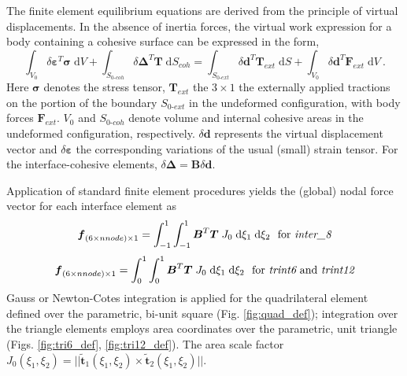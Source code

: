 \documentclass[11pt]{report}
\numberwithin{equation}{section}
\newcommand{\bmf } {\boldsymbol }  %
\newcommand{\ti}{\emph}
\begin{document}
The finite element equilibrium equations are derived from the 
principle of virtual displacements. In the absence of inertia forces, the virtual work 
expression for a body containing a cohesive surface can be expressed in the form,
%
\begin{equation}
\int_{V_0} \delta \bmf{\varepsilon}^T \bmf{\sigma} \;\mathrm{d}V +
\int_{S_{0\mbox{-}coh}} \delta \bmf{\Delta}^T \bmf{T} \;\mathrm{d}S_{coh} =
\int_{S_{0\mbox{-}ext}} \delta \bmf{d}^T \bmf{T}_{ext} \;\mathrm{d}S+
\int_{V_0} \delta \bmf{d}^T \bmf{F}_{ext} \;\mathrm{d}V\ . 
\end {equation}
%
\noindent Here $\bmf{\sigma}$ denotes the stress tensor, 
$\bmf{T}_{ext}$ the ${3 \times 1}$ the externally applied tractions on the portion of the boundary
$S_{0\mbox{-}ext}$ in the undeformed configuration, with body forces $\bmf{F}_{ext}$. $V_0$
and $S_{0\mbox{-}coh}$ denote volume and internal cohesive areas in the undeformed
configuration, respectively. 
$\delta \bmf{d}$ represents the virtual displacement vector and
$\delta \bmf{\varepsilon}$ the corresponding variations of the usual
(small) strain tensor.  For the interface-cohesive elements, 
$\delta \bmf{\Delta} = \bmf{B} \delta \bmf{d}$.

Application of standard finite element procedures yields the (global) nodal force vector 
for each interface element as
%
\begin{equation}
\bmf{f}_{(6 \times nnode) \times 1} = \int_{-1}^1  \int_{-1}^1 
\bmf{B}^T \bmf{T} \; J_0  \;\mathrm{d}\xi_1  \;\mathrm{d}\xi_2 \ 
\ \mathrm{for\ \ti{inter\_8}} 
\end {equation}
%
\begin{equation}
\bmf{f}_{(6 \times nnode) \times 1} = \int_{0}^1  \int_{0}^{1} 
\bmf{B}^T \bmf{T} \; J_0  \;\mathrm{d}\xi_1  \;\mathrm{d}\xi_2   
\ \ \mathrm{for\ \ti{trint6}\ and\ \ti{trint12}} 
\end {equation}
%
\noindent Gauss or Newton-Cotes integration is applied for the quadrilateral 
element defined over the parametric, bi-unit square (Fig. \ref{fig:quad_def}); 
integration over the triangle elements employs area coordinates over the parametric,
unit triangle
(Figs. \ref{fig:tri6_def}, \ref{fig:tri12_def}).  The area scale factor
$J_0(\xi_1,\xi_2)= || \tilde{\bmf{t}}_1(\xi_1,\xi_2) \times \tilde{\bmf{t}}_2(\xi_1,\xi_2) ||$.
\end{document}
